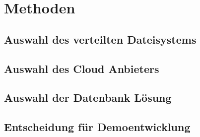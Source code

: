\chapter{Methoden}\label{ch:methods}

\section{Auswahl des verteilten Dateisystems}
\section{Auswahl des Cloud Anbieters}
\section{Auswahl der Datenbank Lösung}
\section{Entscheidung für Demoentwicklung}